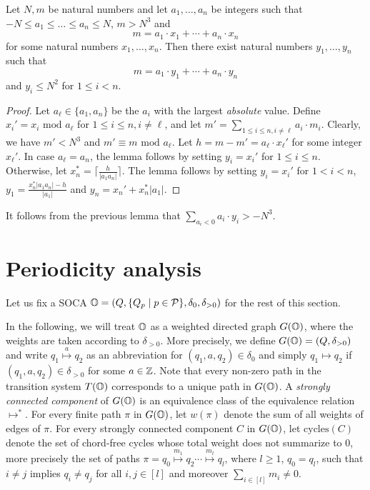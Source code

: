 \documentclass[times,envcountsame]{llncs}
\begin{document}
\begin{lemma}
  \label{lem:bounded-coefficients}
  Let $N,m$ be natural numbers and let $a_1,\ldots, a_n$ be integers
  such that $-N\le a_1 \le \ldots \le a_n\le N$, $m>N^3$ and
  \begin{equation*}
    m = a_1 \cdot x_1 + \cdots + a_n \cdot x_n
  \end{equation*}
  for some natural numbers $x_1, \ldots, x_n$. Then there exist
  natural numbers $y_1, \ldots, y_n$ such that
  \begin{equation*}
    m = a_1 \cdot y_1 + \cdots + a_n \cdot y_n
  \end{equation*}
  and $y_i\le N^2$ for $1\le i<n$.
\end{lemma}
\begin{proof}
  Let $a_\ell\in\{a_1,a_n\}$ be the $a_i$ with the largest
  \emph{absolute} value. Define $x_i' =x_i \text{ mod } a_\ell$ for
  $1\le i\le n, i\neq \ell$, and let $m'= \sum_{1\le i\le n, i\neq
    \ell} a_i\cdot m_i$. Clearly, we have $m'<N^3$ and $m'\equiv m
  \text{ mod } a_\ell$. Let $h=m-m'=a_\ell \cdot x_\ell'$ for some
  integer $x_\ell'$. In case $a_\ell=a_n$, the lemma follows by
  setting $y_i=x_i'$ for $1\le i\le n$. Otherwise, let $x_n^*= \lceil
  \frac{h}{|a_1a_n|} \rceil$. The lemma follows by setting $y_i=x_i'$
  for $1<i<n$, $y_1=\frac{x_n^*|a_1a_n|-h}{|a_1|}$ and $y_n=x_n'+
  x_n^*|a_1|$.
\end{proof}
\begin{remark}
  \label{rem:maximum-valley}
  It follows from the previous lemma that $\sum_{a_i<0} a_i\cdot
  y_i>-N^3$.
\end{remark}

\section{Periodicity analysis}

\newcommand{\cycles}{\textrm{cycles}}

Let us fix a SOCA $\mathbb{O}=(Q,\{Q_p\mid p\in\mathcal{P}\},\delta_0,\delta_{>0})$ for
 the rest of this section.

In the following, we will treat $\mathbb{O}$ as a weighted directed graph $G(\mathbb{O})$, where
the weights are taken according to $\delta_{>0}$.
More precisely, we define $G(\mathbb{O})=(Q,\delta_{>0})$
and write $q_1\stackrel{a}{\mapsto}q_2$ as an abbreviation for
$(q_1,a,q_2)\in\delta_{0}$ and simply $q_1\mapsto q_2$ if
$(q_1,a,q_2)\in\delta_{>0}$ for some $a\in\mathbb{Z}$.
Note that every non-zero path in the transition system $T(\mathbb{O})$ corresponds to a unique path in
$G(\mathbb{O})$.
A {\em strongly connected component} of $G(\mathbb{O})$ is an
equivalence class of the equivalence relation $\mapsto^*$.
For every finite path $\pi$ in $G(\mathbb{O})$, let $w(\pi)$ denote the sum of all
weights of edges of $\pi$.
For every strongly connected component $C$ in $G(\mathbb{O})$, let $\cycles(C)$ denote
the set of chord-free cycles whose total weight does not summarize to $0$,
more precisely
the set of paths $\pi=q_0\stackrel{m_1}{\mapsto} q_2\cdots
\stackrel{m_l}{\mapsto} q_l$, where $l\geq1$,
$q_0=q_l$, such that $i\not= j$ implies $q_i\not=q_j$ for all
$i,j\in[l]$ and moreover $\sum_{i\in[l]}m_i\not=0$.
\end{document}
